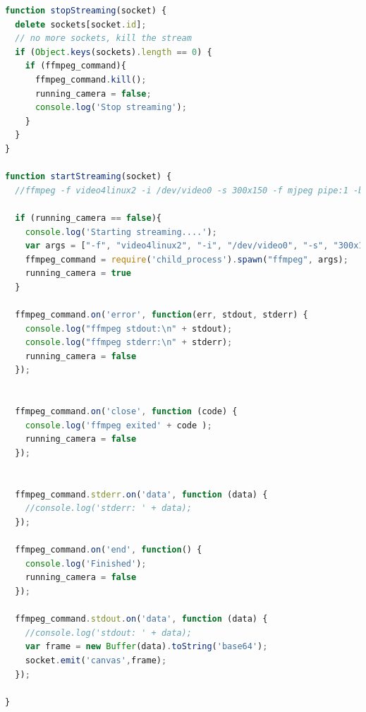\begin{lstlisting}[language=JavaScript]
function stopStreaming(socket) {
  delete sockets[socket.id];
  // no more sockets, kill the stream
  if (Object.keys(sockets).length == 0) {
    if (ffmpeg_command){
      ffmpeg_command.kill();
      running_camera = false;
      console.log('Stop streaming');
    }
  }
}

function startStreaming(socket) {
  //ffmpeg -f video4linux2 -i /dev/video0 -s 300x150 -f mjpeg pipe:1 -b:v 28k -bufsize 28k

  if (running_camera == false){
    console.log('Starting streaming....');
    var args = ["-f", "video4linux2", "-i", "/dev/video0", "-s", "300x150","-f","mjpeg", "pipe:1", "-b:v 28k", "-bufsize 28k"]
    ffmpeg_command = require('child_process').spawn("ffmpeg", args);
    running_camera = true
  }

  ffmpeg_command.on('error', function(err, stdout, stderr) {
    console.log("ffmpeg stdout:\n" + stdout);
    console.log("ffmpeg stderr:\n" + stderr);
    running_camera = false
  });


  ffmpeg_command.on('close', function (code) {
    console.log('ffmpeg exited' + code );
    running_camera = false
  });


  ffmpeg_command.stderr.on('data', function (data) {
    //console.log('stderr: ' + data);
  });

  ffmpeg_command.on('end', function() {
    console.log('Finished');
    running_camera = false
  });

  ffmpeg_command.stdout.on('data', function (data) {
    //console.log('stdout: ' + data);
    var frame = new Buffer(data).toString('base64');
    socket.emit('canvas',frame);
  });

}

\end{lstlisting}

